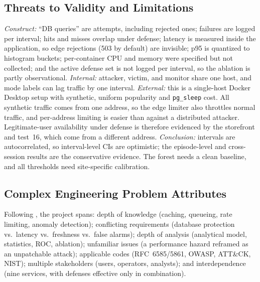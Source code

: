 \documentclass[journal]{IEEEtran}
\begin{document}
\subsection{Threats to Validity and Limitations}
\label{sec:validity}
\emph{Construct:} ``DB queries'' are attempts, including rejected ones; failures are
logged per interval; hits and misses overlap under defense; latency is measured inside
the application, so edge rejections (503 by default) are invisible; p95 is quantized to
histogram buckets; per-container CPU and memory were specified but not collected; and
the active defense set is not logged per interval, so the ablation is partly
observational. \emph{Internal:} attacker, victim, and monitor share one host, and mode
labels can lag traffic by one interval. \emph{External:} this is a single-host Docker
Desktop setup with synthetic, uniform popularity and \texttt{pg\_sleep} cost. All
synthetic traffic comes from one address, so the edge limiter also throttles normal
traffic, and per-address limiting is easier than against a distributed attacker.
Legitimate-user availability under defense is therefore evidenced by the storefront and
test~16, which come from a different address. \emph{Conclusion:} intervals are
autocorrelated, so interval-level CIs are optimistic; the episode-level and
cross-session results are the conservative evidence. The forest needs a clean baseline,
and all thresholds need site-specific calibration.

\subsection{Complex Engineering Problem Attributes}
Following \cite{ieagapc2021}, the project spans: depth of knowledge (caching, queueing,
rate limiting, anomaly detection); conflicting requirements (database protection vs.\
latency vs.\ freshness vs.\ false alarms); depth of analysis (analytical model,
statistics, ROC, ablation); unfamiliar issues (a performance hazard reframed as an
unpatchable attack); applicable codes (RFC~6585/5861, OWASP, ATT\&CK, NIST); multiple
stakeholders (users, operators, analysts); and interdependence (nine services, with
defenses effective only in combination).

\end{document}
